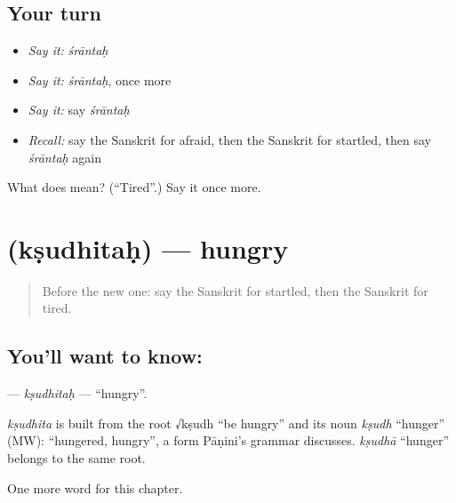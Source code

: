 \subsection*{Your turn}
\begin{itemize}
\raggedright
  \item \emph{Say it:} \emph{śrāntaḥ}
  \item \emph{Say it:} \emph{śrāntaḥ}, once more
  \item \emph{Say it:} say \emph{śrāntaḥ}
  \item \emph{Recall:} say the Sanskrit for afraid, then the Sanskrit for startled, then say \emph{śrāntaḥ} again
\end{itemize}

\begin{tcolorbox}[breakable,colback=teal!4,colframe=teal!35!black,title={Before you move on}]
What does  mean? (\textquotedblleft{}Tired\textquotedblright{}.) Say it once more.
\end{tcolorbox}
\section[\texorpdfstring{\sk{क्षुधितः} (kṣudhitaḥ)}{क्षुधितः (kṣudhitaḥ)}]{ (kṣudhitaḥ) — hungry}

\label{lesson:SA-C157-ksudhitah}



\begin{quote}
Before the new one: say the Sanskrit for startled, then the Sanskrit for tired.
\end{quote}

\subsection*{You'll want to know: }
\textbf{} — \emph{kṣudhitaḥ} — \textquotedblleft{}hungry\textquotedblright{}.

\begin{cousinweb}
\emph{kṣudhita} is built from the root √kṣudh \textquotedblleft{}be hungry\textquotedblright{} and its noun \emph{kṣudh} \textquotedblleft{}hunger\textquotedblright{} (MW): \textquotedblleft{}hungered, hungry\textquotedblright{}, a form Pāṇini's grammar discusses. \emph{kṣudhā} \textquotedblleft{}hunger\textquotedblright{} belongs to the same root.
\end{cousinweb}

\begin{grammarlens}[title={What you've built}]
One more word for this chapter.
\end{grammarlens}

